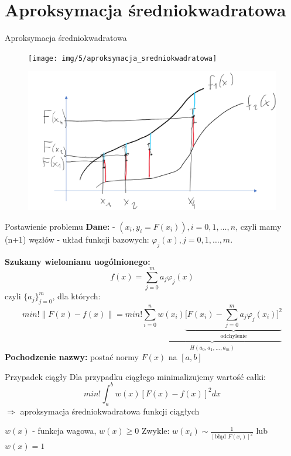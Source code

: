 \section{Aproksymacja średniokwadratowa}
\begin{frame}{Aproksymacja średniokwadratowa}
  	\begin{figure}
	\texttt{[image: img/5/aproksymacja\_sredniokwadratowa]}
	\end{figure}
\end{frame}
\begin{frame}
    \begin{figure}
        \includegraphics[height=0.7\textheight]{img/5/approx_przy.png}
    \end{figure}
\end{frame}
\begin{frame}{Postawienie problemu}
	\textbf{Dane:}\newline
    - ${(x_i,y_i = F(x_i)),i=0,1,\ldots,n}$, czyli mamy (n+1) węzłów \newline
    - układ funkcji bazowych: $\varphi_j(x), j=0,1,\ldots,m$.\newline\par
    \textbf{Szukamy wielomianu uogólnionego:}
    $$f(x) = \sum_{j = 0}^{m} a_j \varphi_j(x)$$
    czyli $\{{a_j}\}_{j=0}^m$, dla których:
    $$min!\parallel F(x) - f(x) \parallel = min!\underbrace{ \sum_{i=0}^{n}w(x_i)\underbrace{\bigg[F(x_i)-\sum_{j=0}^{m}a_j\varphi_j(x_i)\bigg]^2}_\text{odchylenie}}_{H(a_0,a_1,\ldots,a_m)}$$
    \textbf{Pochodzenie nazwy:} postać normy $F(x)$ na $[a,b]$
\end{frame}
\begin{frame}{Przypadek ciągły}
    Dla przypadku ciągłego minimalizujemy wartość całki:
    $$min!\int_a^bw(x)[F(x)-f(x)]^2dx%
    $$
    $\Rightarrow$ aproksymacja średniokwadratowa funkcji ciągłych\newline

    $w(x)$ - funkcja wagowa, $w(x)\geqslant0$ \newline
    Zwykle: $w(x_i) \sim \frac{1}{[\text{błąd }F(x_i)]^2}$ lub $w(x) = 1$
\end{frame}
